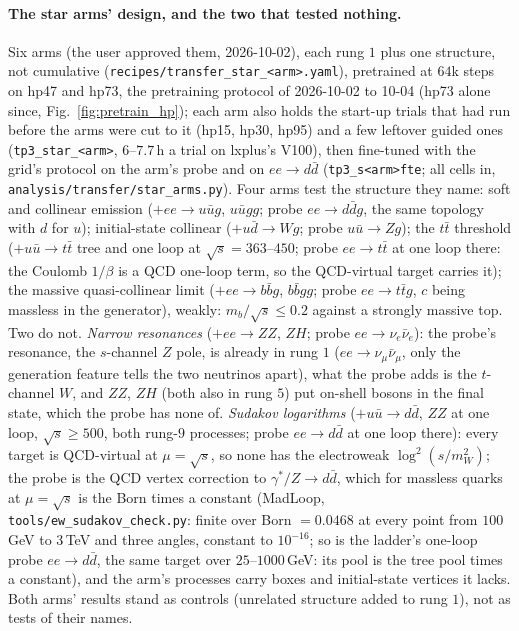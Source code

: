 \documentclass[11pt]{article}
\newcommand{\code}[1]{\texttt{#1}}
\begin{document}
\paragraph{The star arms' design, and the two that tested nothing.} Six arms (the user approved them, 2026-10-02), each rung $1$ plus one
structure, not cumulative (\code{recipes/transfer\_star\_<arm>.yaml}), pretrained at $64$k steps on hp47 and hp73, the
pretraining protocol of 2026-10-02 to 10-04 (hp73 alone since, Fig.~\ref{fig:pretrain_hp}); each arm also holds the
start-up trials that had run before the arms were cut to it (hp15, hp30, hp95) and a few leftover guided ones
(\code{tp3\_star\_<arm>}, $6$--$7.7$\,h a trial on lxplus's V100), then
fine-tuned with the grid's protocol on the arm's probe and on $ee\to d\bar d$ (\code{tp3\_s<arm>fte}; all cells in,
\code{analysis/transfer/star\_arms.py}). Four arms test the structure they name: soft and collinear emission
($+ee\to u\bar ug$, $u\bar ugg$; probe $ee\to d\bar dg$, the same topology with $d$ for $u$); initial-state collinear
($+u\bar d\to Wg$; probe $u\bar u\to Zg$); the $t\bar t$ threshold ($+u\bar u\to t\bar t$ tree and one loop at
$\sqrt s=363$--$450$; probe $ee\to t\bar t$ at one loop there: the Coulomb $1/\beta$ is a QCD one-loop term, so the
QCD-virtual target carries it); the massive quasi-collinear limit ($+ee\to b\bar bg$, $b\bar bgg$; probe $ee\to t\bar tg$,
$c$ being massless in the generator), weakly: $m_b/\sqrt s\le0.2$ against a strongly massive top. Two do not.
\emph{Narrow resonances} ($+ee\to ZZ$, $ZH$; probe $ee\to\nu_e\bar\nu_e$): the probe's resonance, the $s$-channel $Z$
pole, is already in rung $1$ ($ee\to\nu_\mu\bar\nu_\mu$, only the generation feature tells the two neutrinos apart), what
the probe adds is the $t$-channel $W$, and $ZZ$, $ZH$ (both also in rung $5$) put on-shell bosons in the final state,
which the probe has none of. \emph{Sudakov logarithms} ($+u\bar u\to d\bar d$, $ZZ$ at one loop, $\sqrt s\ge500$, both
rung-$9$ processes; probe $ee\to d\bar d$ at one loop there): every target is QCD-virtual at $\mu=\sqrt s$, so none
has the electroweak $\log^2(s/m_W^2)$; the probe is the QCD vertex correction to $\gamma^*/Z\to d\bar d$, which for
massless quarks at $\mu=\sqrt s$ is the Born times a constant (MadLoop, \code{tools/ew\_sudakov\_check.py}: finite over
Born $=0.0468$ at every point from $100$\,GeV to $3$\,TeV and three angles, constant to $10^{-16}$; so is the ladder's
one-loop probe $ee\to d\bar d$, the same target over $25$--$1000$\,GeV: its pool is the tree pool times a constant),
and the arm's processes carry boxes and initial-state vertices it lacks. Both arms' results stand as controls (unrelated
structure added to rung $1$), not as tests of their names. 
\end{document}

